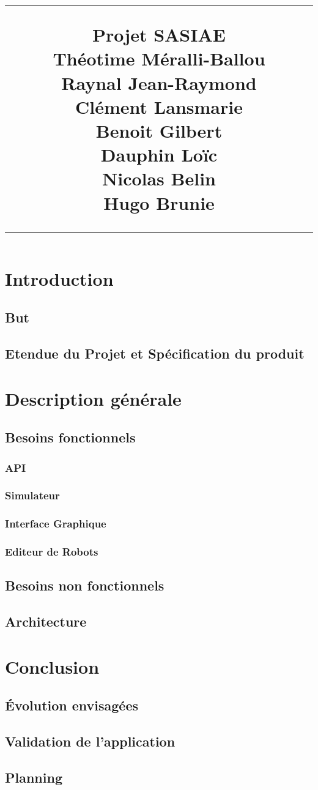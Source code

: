 \documentclass{scrreprt}
\title{%
\flushright
\rule{16cm}{5pt}
\vskip1cm
{\Huge Projet SASIAE}\\
\vspace{10cm}
{\small Théotime Méralli-Ballou\\ Raynal Jean-Raymond\\ Clément Lansmarie\\ Benoit Gilbert\\ Dauphin Loïc\\ Nicolas Belin\\ Hugo Brunie\\ }
\vfill
\rule{16cm}{5pt}
}
\date{}
\begin{document}
\maketitle
\tableofcontents

\chapter{Introduction}

\section{But}
\section{Etendue du Projet et Spécification du produit}


\chapter{Description générale}

\section{Besoins fonctionnels}

\subsection{API}


\subsection{Simulateur}


\subsection{Interface Graphique}


\subsection{Editeur de Robots}


\section{Besoins non fonctionnels}
%

\section{Architecture}


\chapter{Conclusion}

\section{Évolution envisagées}

\section{Validation de l'application}

\section{Planning}
\end{document}
